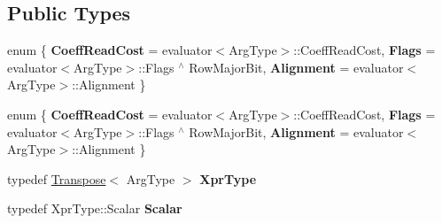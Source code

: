 \subsection*{Public Types}
\begin{DoxyCompactItemize}
\item 
\mbox{\label{struct_eigen_1_1internal_1_1unary__evaluator_3_01_transpose_3_01_arg_type_01_4_00_01_index_based_01_4_a6c8ae4f2e563458afc4029e60eaf2212}} 
enum \{ {\bfseries Coeff\+Read\+Cost} = evaluator$<$Arg\+Type$>$\+:\+:Coeff\+Read\+Cost, 
{\bfseries Flags} = evaluator$<$Arg\+Type$>$\+:\+:Flags $^\wedge$ Row\+Major\+Bit, 
{\bfseries Alignment} = evaluator$<$Arg\+Type$>$\+:\+:Alignment
 \}
\item 
\mbox{\label{struct_eigen_1_1internal_1_1unary__evaluator_3_01_transpose_3_01_arg_type_01_4_00_01_index_based_01_4_a2d75177d71faa44bf0fc45ab94cea4a0}} 
enum \{ {\bfseries Coeff\+Read\+Cost} = evaluator$<$Arg\+Type$>$\+:\+:Coeff\+Read\+Cost, 
{\bfseries Flags} = evaluator$<$Arg\+Type$>$\+:\+:Flags $^\wedge$ Row\+Major\+Bit, 
{\bfseries Alignment} = evaluator$<$Arg\+Type$>$\+:\+:Alignment
 \}
\item 
\mbox{\label{struct_eigen_1_1internal_1_1unary__evaluator_3_01_transpose_3_01_arg_type_01_4_00_01_index_based_01_4_aaad78806253598991f290281fc80154e}} 
typedef \hyperlink{group___core___module_class_eigen_1_1_transpose}{Transpose}$<$ Arg\+Type $>$ {\bfseries Xpr\+Type}
\item 
\mbox{\label{struct_eigen_1_1internal_1_1unary__evaluator_3_01_transpose_3_01_arg_type_01_4_00_01_index_based_01_4_a64946df51088cc9e1ed89e47fc61d33c}} 
typedef Xpr\+Type\+::\+Scalar {\bfseries Scalar}
\item 
\mbox{\label{struct_eigen_1_1internal_1_1unary__evaluator_3_01_transpose_3_01_arg_type_01_4_00_01_index_based_01_4_a29ac036c7acef87f765dd49e70d190ee}} 

\end{DoxyCompactItemize}
